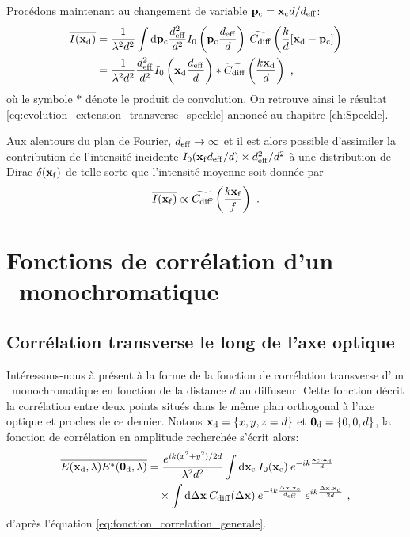Procédons maintenant au changement de variable $\mathbf{p}_{\mathrm{c}} = \mathbf{x}_{\mathrm{c}} d/d_{\mathrm{eff}}$:
\begin{align}
\overline{I(\mathbf{x}_{\mathrm{d}})} &= \frac{1}{\lambda^2d^2} \int{\mathop{}\mathopen{}\mathrm{d}\mathbf{p}_{\mathrm{c}} \frac{d_{\mathrm{eff}}^2}{d^2} I_0\left( \mathbf{p}_{\mathrm{c}} \frac{d_{\mathrm{eff}}}{d}\right) \: \widetilde{C_{\mathrm{diff}}} \left( \frac{k}{d} [\mathbf{x}_{\mathrm{d}}- \mathbf{p}_{\mathrm{c}}] \right)} \\
&= \frac{1}{\lambda^2 d^2} \frac{d_{\mathrm{eff}}^2}{d^2} I_0\left( \mathbf{x}_{\mathrm{d}} \frac{d_{\mathrm{eff}}}{d}\right) \ast \widetilde{C_{\mathrm{diff}}}\left( \frac{k\mathbf{x}_{\mathrm{d}}}{d}\right) \text{ ,}
\end{align}
où le symbole $\ast$ dénote le produit de convolution. On retrouve ainsi le résultat \ref{eq:evolution_extension_transverse_speckle} annoncé au chapitre \ref{ch:Speckle}.

Aux alentours du plan de Fourier, $d_{\mathrm{eff}}\rightarrow\infty$ et il est alors possible d'assimiler la contribution de l'intensité incidente $I_0(\mathbf{x}_{\mathrm{f}} d_{\mathrm{eff}}/d) \times d_{\mathrm{eff}}^2/d^2$ à une distribution de Dirac $\delta(\mathbf{x}_{\mathrm{f}})$ de telle sorte que l'intensité moyenne soit donnée par
\begin{equation}
\overline{I(\mathbf{x}_{\mathrm{f}})} \propto \widetilde{C_{\mathrm{diff}}}\left( \frac{k\mathbf{x}_{\mathrm{f}}}{f}\right) \text{ .}
\end{equation}




\section{Fonctions de corrélation d'un \speckle\ monochromatique}
\subsection{Corrélation transverse le long de l'axe optique}
Intéressons-nous à présent à la forme de la fonction de corrélation transverse d'un \speckle\ monochromatique en fonction de la distance $d$ au diffuseur. Cette fonction décrit la corrélation entre deux points situés dans le même plan orthogonal à l'axe optique et proches de ce dernier. Notons $\mathbf{x}_{\mathrm{d}}=\lbrace x,y,z=d\rbrace$ et $\mathbf{0}_{\mathrm{d}}=\lbrace 0,0,d \rbrace$, la fonction de corrélation en amplitude recherchée s'écrit alors:
\begin{align}
\overline{E(\mathbf{x}_{\mathrm{d}},\lambda)E^*(\mathbf{0}_{\mathrm{d}},\lambda)} &= \frac{e^{i k (x^2+y^2)/2d}}{\lambda^2 d^2} \int{\mathop{}\mathopen{}\mathrm{d}\mathbf{x}_{\mathrm{c}}\: I_0(\mathbf{x}_{\mathrm{c}}) \: e^{-i k \frac{\mathbf{x}_{\mathrm{c}}.\mathbf{x}_{\mathrm{d}}}{d}}} \\
&\nonumber \quad \times \int{\mathop{}\mathopen{}\mathrm{d}\Delta\mathbf{x}\: C_{\mathrm{diff}}(\Delta\mathbf{x}) \: e^{-ik \frac{\Delta\mathbf{x}. \mathbf{x}_{\mathrm{c}}}{d_{\mathrm{eff}}}} \: e^{ik \frac{\Delta\mathbf{x}. \mathbf{x}_{\mathrm{d}}}{2d}}} \text{ ,}
\end{align}
d'après l'équation \ref{eq:fonction_correlation_generale}.

